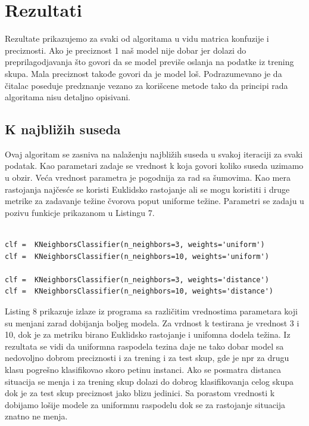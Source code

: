 \documentclass[14pt]{extarticle}
\begin{document}
\section{Rezultati}
\label{Rezultati}
Rezultate prikazujemo za svaki od algoritama u vidu matrica konfuzije i preciznosti. Ako je preciznost 1 naš model nije dobar jer dolazi do preprilagodjavanja što govori da se model previše oslanja na podatke iz trening skupa. Mala preciznost takođe govori da je model loš. Podrazumevano je da čitalac poseduje predznanje vezano za korišcene metode tako da principi rada algoritama nisu detaljno opisivani.

\subsection{K najbližih suseda}
\label{subsec:podnaslovM}
Ovaj algoritam se zasniva na nalaženju najbližih suseda u svakoj iteraciji za svaki podatak. Kao parametari zadaje se vrednost k koja govori koliko suseda uzimamo u obzir. Veća vrednost parametra je pogodnija za rad sa šumovima. Kao mera rastojanja najčesće se koristi Euklidsko rastojanje ali se mogu koristiti i druge metrike za zadavanje težine čvorova poput uniforme težine. Parametri se zadaju u pozivu funkicje prikazanom u Listingu 7. 

\begin{lstlisting}[caption={Vizuelizacija},frame=single, label=simple]

clf =  KNeighborsClassifier(n_neighbors=3, weights='uniform')
clf =  KNeighborsClassifier(n_neighbors=10, weights='uniform')

clf =  KNeighborsClassifier(n_neighbors=3, weights='distance')
clf =  KNeighborsClassifier(n_neighbors=10, weights='distance')

\end{lstlisting}

Listing 8 prikazuje izlaze iz programa sa različitim vrednostima parametara koji su menjani zarad dobijanja boljeg modela. Za vrdnost k testirana je vrednost 3 i 10, dok je za metriku birano Euklidsko rastojanje i unifomna dodela težina. Iz rezultata se vidi da uniformna raspodela tezina daje ne tako dobar model sa nedovoljno dobrom preciznosti i za trening i za test skup, gde je npr za drugu klasu pogrešno klasifikovao skoro petinu instanci. Ako se posmatra distanca situacija se menja i za trening skup dolazi do dobrog klasifikovanja celog skupa dok je za test skup preciznost jako blizu jedinici. Sa porastom vrednosti k dobijamo lošije modele za uniformnu raspodelu dok se za rastojanje situacija znatno ne menja.
\end{document}
